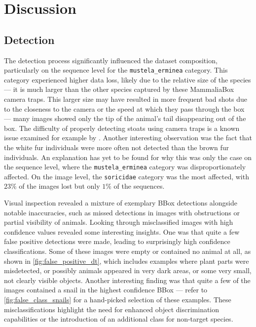 


\section{Discussion}
\label{discussion}

\subsection{Detection}
The detection process significantly influenced the dataset composition, particularly on the sequence level for the \texttt{mustela\_erminea} category.
This category experienced higher data loss, likely due to the relative size of the species --- it is much larger than the other species captured by these MammaliaBox camera traps.
This larger size may have resulted in more frequent bad shots due to the closeness to the camera or the speed at which they pass through the box --- many images showed only the tip of the animal's tail disappearing out of the box.
The difficulty of properly detecting stoats using camera traps is a known issue examined for example by \textcite{crooseAssessingDetectabilityIrish2022}.
Another interesting observation was the fact that the white fur individuals were more often not detected than the brown fur individuals.
An explanation has yet to be found for why this was only the case on the sequence level, where the \texttt{mustela\_erminea} category was disproportionately affected.
On the image level, the \texttt{soricidae} category was the most affected, with \(23\%\) of the images lost but only \(1\%\) of the sequences.

Visual inspection revealed a mixture of exemplary BBox detections alongside notable inaccuracies, such as missed detections in images with obstructions or partial visibility of animals.
Looking through misclassified images with high confidence values revealed some interesting insights.
One was that quite a few false positive detections were made, leading to surprisingly high confidence classifications.
Some of these images were empty or contained no animal at all, as shown in \autoref{fig:false_positive_dt}, which includes examples where plant parts were misdetected, or possibly animals appeared in very dark areas, or some very small, not clearly visible objects.
Another interesting finding was that quite a few of the images contained a snail in the highest confidence BBox --- refer to \autoref{fig:false_class_snails} for a hand-picked selection of these examples.
These misclassifications highlight the need for enhanced object discrimination capabilities or the introduction of an additional class for non-target species.

